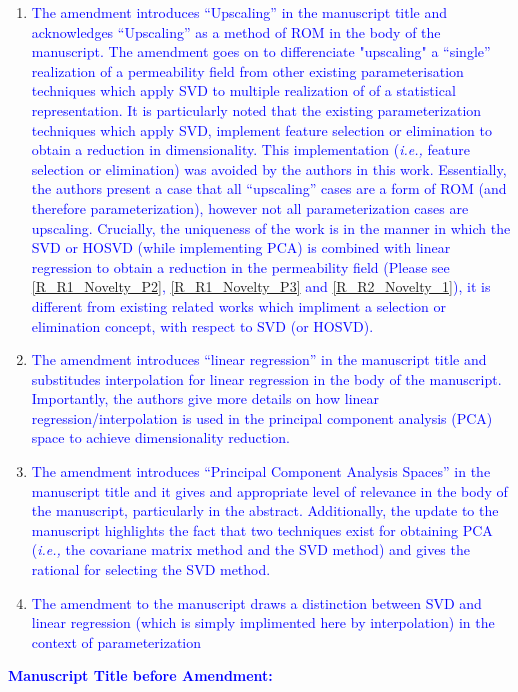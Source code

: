 \documentclass[11pt]{letter} %
\newcommand{\blue}{\textcolor{blue}}
\newcommand{\ie}{{\it i.e., }}
\begin{document}
\begin{letter}
{\begin{enumerate}
\begin{enumerate}
\begin{enumerate}
      \item \label{R_R1_Novelty_P1} \blue{The amendment introduces ``Upscaling'' in the manuscript title and acknowledges ``Upscaling'' as a method of ROM in the body of the manuscript. The amendment goes on to differenciate "upscaling" a ``single'' realization of a permeability field from other existing parameterisation techniques which apply SVD to multiple realization of of a statistical representation. It is particularly noted that the existing parameterization techniques which apply SVD, implement feature selection or elimination to obtain a reduction in dimensionality. This implementation (\ie feature selection or elimination) was avoided by the authors in this work. Essentially, the authors present a case that all ``upscaling'' cases are a form of ROM (and therefore parameterization), however not all parameterization cases are upscaling. Crucially, the uniqueness of the work is in the manner in which the SVD or HOSVD (while implementing PCA) is combined with linear regression to obtain a reduction in the permeability field (Please see \ref{R_R1_Novelty_P2}, \ref{R_R1_Novelty_P3} and \ref{R_R2_Novelty_1}), it is different from existing related works which impliment a selection or elimination concept, with respect to SVD (or HOSVD).}
      \item \label{R_R1_Novelty_P2} \blue {The amendment introduces ``linear regression'' in the manuscript title and substitudes interpolation for linear regression in the body of the manuscript. Importantly, the authors give more details on how linear regression/interpolation is used in the principal component analysis (PCA) space to achieve dimensionality reduction.}
      \item \label{R_R1_Novelty_P3} \blue{The amendment introduces ``Principal Component Analysis Spaces'' in the manuscript title and it gives and appropriate level of relevance in the body of the manuscript, particularly in the abstract. Additionally, the update to the manuscript highlights the fact that two techniques exist for obtaining PCA (\ie {the covariane matrix method and the SVD method}) and gives the rational for selecting the SVD method.}
        \item \label{R_R1_Novelty_P4} \blue{The amendment to the manuscript draws a distinction between SVD and linear regression (which is simply implimented here by interpolation) in the context of parameterization}\\
      \end{enumerate}
      \blue{\bf{Manuscript Title before Amendment:}}

\end{enumerate}
\end{enumerate}}
\end{letter}
\end{document}
